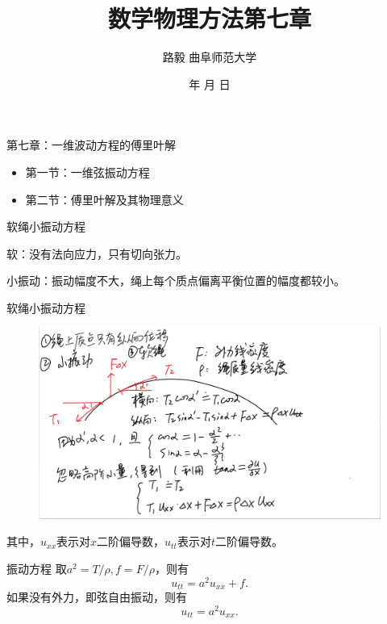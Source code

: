 \documentclass[11pt]{beamer}
\newcommand{\kong}[1][0.5]{\vspace{#1cm}}
\begin{document}
	\author{ 路毅 \hspace{0.3cm} 曲阜师范大学 }
	\date{\number\year 年 \number\month 月 \number\day 日}
	\title{数学物理方法第七章}

\begin{frame}
	\maketitle
\end{frame}

\kaishu

\begin{frame}{第七章：一维波动方程的傅里叶解}
\begin{itemize}
	\item 第一节：一维弦振动方程
	\vspace{1cm}
	\item 第二节：傅里叶解及其物理意义
\end{itemize}
\end{frame}

\begin{frame}{软绳小振动方程}

\kong[1]
软：没有法向应力，只有切向张力。

\kong[1]
小振动：振动幅度不大，绳上每个质点偏离平衡位置的幅度都较小。
\end{frame}

\begin{frame}{软绳小振动方程}
\begin{figure}
\centering
\includegraphics[width=\linewidth]{弦振动方程}
\end{figure}
其中，$u_{xx}$表示对$x$二阶偏导数，$u_{tt}$表示对$t$二阶偏导数。
\end{frame}

\begin{frame}{振动方程}
取$ a^2 = T/\rho, f = F/\rho$，则有
\begin{equation}
u_{tt}　= a^2 u_{xx} + f.
\end{equation}
如果没有外力，即弦自由振动，则有
\begin{equation}
u_{tt}　= a^2 u_{xx}.
\end{equation}
\end{frame}
\end{document}
